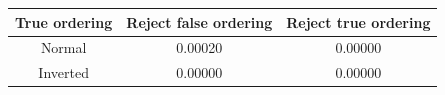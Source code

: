 \begin{tabular}{| c | c | c |}
\hline
True ordering & Reject false ordering & Reject true ordering \\
\hline
Normal & 0.00020 & 0.00000 \\
Inverted & 0.00000 & 0.00000 \\
\hline
\end{tabular}
